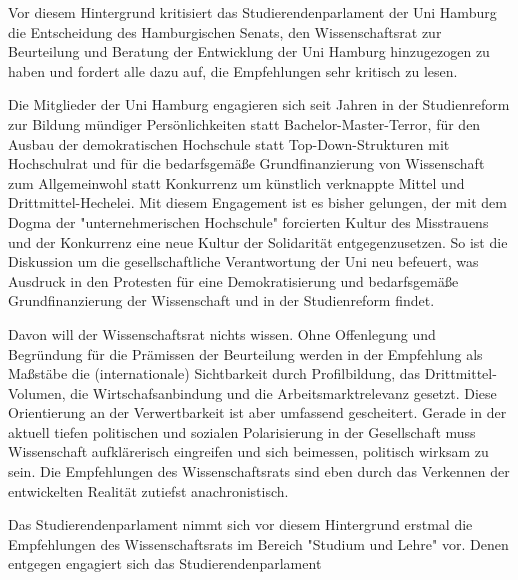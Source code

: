 \documentclass[ngerman,headheight=70pt]{scrartcl}
\begin{document}
    Vor diesem Hintergrund kritisiert das Studierendenparlament der Uni Hamburg
    die Entscheidung des Hamburgischen Senats, den Wissenschaftsrat zur Beurteilung
    und Beratung der Entwicklung der Uni Hamburg hinzugezogen zu haben und fordert
    alle dazu auf, die Empfehlungen sehr kritisch zu lesen.

    Die Mitglieder der Uni Hamburg engagieren sich seit Jahren in der Studienreform
    zur Bildung mündiger Persönlichkeiten statt Bachelor-Master-Terror, für den
    Ausbau der demokratischen Hochschule statt Top-Down-Strukturen mit
    Hochschulrat und für die bedarfsgemäße Grundfinanzierung von Wissenschaft zum
    Allgemeinwohl statt Konkurrenz um künstlich verknappte Mittel und
    Drittmittel-Hechelei. Mit diesem Engagement ist es bisher gelungen, der mit
    dem Dogma der "unternehmerischen Hochschule" forcierten Kultur des Misstrauens
    und der Konkurrenz eine neue Kultur der Solidarität entgegenzusetzen. So ist
    die Diskussion um die gesellschaftliche Verantwortung der Uni neu befeuert,
    was Ausdruck in den Protesten für eine Demokratisierung und bedarfsgemäße
    Grundfinanzierung der Wissenschaft und in der Studienreform findet.

    Davon will der Wissenschaftsrat nichts wissen. Ohne Offenlegung und Begründung
    für die Prämissen der Beurteilung werden in der Empfehlung als Maßstäbe die
    (internationale) Sichtbarkeit durch Profilbildung, das Drittmittel-Volumen,
    die Wirtschafsanbindung und die Arbeitsmarktrelevanz gesetzt. Diese Orientierung
    an der Verwertbarkeit ist aber umfassend gescheitert. Gerade in der aktuell
    tiefen politischen und sozialen Polarisierung in der Gesellschaft muss
    Wissenschaft aufklärerisch eingreifen und sich beimessen, politisch wirksam
    zu sein. Die Empfehlungen des Wissenschaftsrats sind eben durch das
    Verkennen der entwickelten Realität zutiefst anachronistisch.

    Das Studierendenparlament nimmt sich vor diesem Hintergrund erstmal die
    Empfehlungen des Wissenschaftsrats im Bereich "Studium und Lehre" vor. Denen
    entgegen engagiert sich das Studierendenparlament
\end{document}
